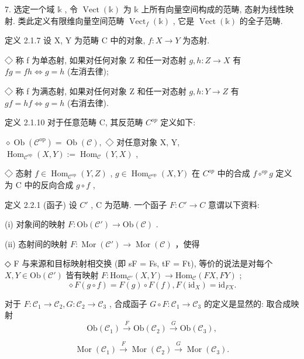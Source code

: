 \documentclass[]{article}
\begin{document}
7. 选定一个域 $\mathbb{k}$ , 令 $\operatorname{Vect}(\mathbb{k})$ 为 $\mathbb{k}$ 上所有向量空间构成的范畴, 态射为线性映射. 类此定义有限维向量空间范畴 $\operatorname{Vect}_f(\mathbb{k})$ , 它是 $\operatorname{Vect}(\mathbb{k})$ 的全子范畴.  

定义 2.1.7 设 X, Y 为范畴 C 中的对象, $f: X \rightarrow Y$ 为态射. 

◇ 称 f 为单态射, 如果对任何对象 Z 和任一对态射 $g, h: Z \rightarrow X$ 有 $fg = fh \iff g = h$ (左消去律); 

◇ 称 f 为满态射, 如果对任何对象 Z 和任一对态射 $g, h: Y \rightarrow Z$ 有 $gf = hf \iff g = h$ (右消去律). 

定义 2.1.10 对于任意范畴 C, 其反范畴 $C^{op}$ 定义如下: 

$\diamond \operatorname{Ob}(\mathcal{C}^{\mathrm{op}}) = \operatorname{Ob}(\mathcal{C}),$ 
◇ 对任意对象 X, Y, $\operatorname{Hom}_{\mathcal{C}^{\mathrm{op}}}(X, Y) := \operatorname{Hom}_{\mathcal{C}}(Y, X)$ , 

◇ 态射 $f \in \operatorname{Hom}_{\mathcal{C}^{\mathrm{op}}}(Y, Z)$ , $g \in \operatorname{Hom}_{\mathcal{C}^{\mathrm{op}}}(X, Y)$ 在 $C^{op}$ 中的合成 $f \circ^{op} g$ 定义为 C 中的反向合成 $g \circ f$ , 

定义 2.2.1 (函子) 设 $C'$ , C 为范畴. 一个函子 $F : C' \rightarrow C$ 意谓以下资料: 

(i) 对象间的映射 $F: \mathrm{Ob}(\mathcal{C}') \to \mathrm{Ob}(\mathcal{C})$ . 

(ii) 态射间的映射 $F: \operatorname{Mor}(\mathcal{C}') \to \operatorname{Mor}(\mathcal{C})$ ，使得

◇ F 与来源和目标映射相交换 (即 sF = Fs, tF = Ft), 等价的说法是对每个 $X, Y \in \mathrm{Ob}(\mathcal{C}')$ 皆有映射 $F: \mathrm{Hom}_{\mathcal{C}'}(X, Y) \to \mathrm{Hom}_{\mathcal{C}}(FX, FY)$ ; $$
\diamond F (g \circ f) = F (g) \circ F (f), F (\mathrm{id} _ {X}) = \mathrm{id} _ {F X}.
$$

对于 $F: \mathcal{C}_1 \to \mathcal{C}_2, G: \mathcal{C}_2 \to \mathcal{C}_3$ , 合成函子 $G \circ F: \mathcal{C}_1 \to \mathcal{C}_3$ 的定义是显然的: 取合成映射  $$
\mathrm{Ob} (\mathcal {C} _ {1}) \stackrel {{F}} {{\longrightarrow}} \mathrm{Ob} (\mathcal {C} _ {2}) \stackrel {{G}} {{\longrightarrow}} \mathrm{Ob} (\mathcal {C} _ {3}),
$$

$$
\operatorname{Mor} (\mathcal {C} _ {1}) \stackrel {{F}} {{\longrightarrow}} \operatorname{Mor} (\mathcal {C} _ {2}) \stackrel {{G}} {{\longrightarrow}} \operatorname{Mor} (\mathcal {C} _ {3}).
$$
\end{document}
